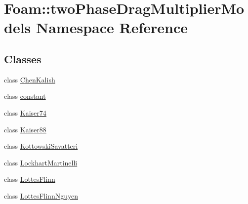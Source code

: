 \hypertarget{namespaceFoam_1_1twoPhaseDragMultiplierModels}{}\section{Foam\+:\+:two\+Phase\+Drag\+Multiplier\+Models Namespace Reference}
\label{namespaceFoam_1_1twoPhaseDragMultiplierModels}
\subsection*{Classes}
\begin{DoxyCompactItemize}
\item 
class \hyperlink{classFoam_1_1twoPhaseDragMultiplierModels_1_1ChenKalish}{Chen\+Kalish}
\item 
class \hyperlink{classFoam_1_1twoPhaseDragMultiplierModels_1_1constant}{constant}
\item 
class \hyperlink{classFoam_1_1twoPhaseDragMultiplierModels_1_1Kaiser74}{Kaiser74}
\item 
class \hyperlink{classFoam_1_1twoPhaseDragMultiplierModels_1_1Kaiser88}{Kaiser88}
\item 
class \hyperlink{classFoam_1_1twoPhaseDragMultiplierModels_1_1KottowskiSavatteri}{Kottowski\+Savatteri}
\item 
class \hyperlink{classFoam_1_1twoPhaseDragMultiplierModels_1_1LockhartMartinelli}{Lockhart\+Martinelli}
\item 
class \hyperlink{classFoam_1_1twoPhaseDragMultiplierModels_1_1LottesFlinn}{Lottes\+Flinn}
\item 
class \hyperlink{classFoam_1_1twoPhaseDragMultiplierModels_1_1LottesFlinnNguyen}{Lottes\+Flinn\+Nguyen}
\end{DoxyCompactItemize}
